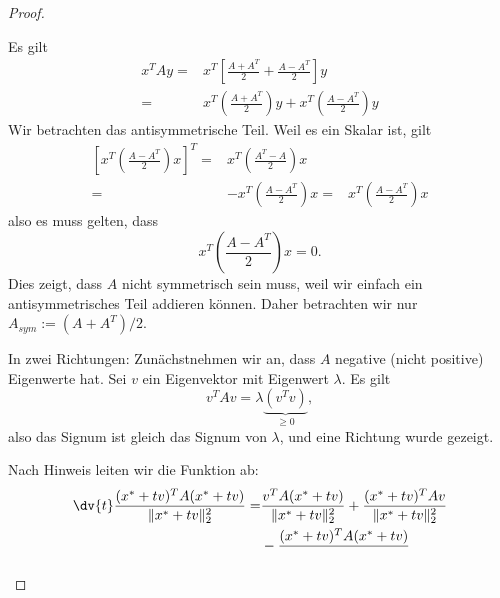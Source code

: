 \begin{proof}
	\begin{parts}
	\item Es gilt
		\begin{align*}
			x^TAy=&x^T\left[ \frac{A+A^T}{2}+\frac{A-A^T}{2} \right] y\\
			=&x^T\left( \frac{A+A^T}{2} \right)y+x^T\left( \frac{A-A^T}{2} \right) y
		\end{align*}
		Wir betrachten das antisymmetrische Teil. Weil es ein Skalar ist, gilt
		\begin{align*}
			\left[ x^T\left( \frac{A-A^T}{2} \right) x \right]^T=& x^T\left( \frac{A^T-A}{2} \right) x\\
			=&-x^T\left( \frac{A-A^T}{2} \right) x
			=&x^T\left( \frac{A-A^T}{2} \right) x
		\end{align*}
		also es muss gelten, dass
		\[
		x^T\left( \frac{A-A^T}{2} \right) x=0
		.\] 
		Dies zeigt, dass $A$ nicht symmetrisch sein muss, weil wir einfach ein antisymmetrisches Teil addieren können. Daher betrachten wir nur $A_{sym}:=(A+A^T) / 2$.

		In zwei Richtungen: Zunächstnehmen wir an, dass $A$ negative (nicht positive) Eigenwerte hat. Sei $v$ ein Eigenvektor mit Eigenwert $\lambda$. Es gilt
		\[
			v^TAv=\lambda\underbrace{(v^Tv)}_{\ge 0}
		,\]
		also das Signum ist gleich das Signum von $\lambda$, und eine Richtung wurde gezeigt.

		Nach Hinweis leiten wir die Funktion ab:
		\begin{align*}
			\dv{t}\frac{(x^*+tv)^TA(x^*+tv)}{\|x^*+tv\|_2^2}=&\frac{v^TA(x^*+tv)}{\|x^*+tv\|_2^2}+\frac{(x^*+tv)^TAv}{\|x^*+tv\|_2^2}\\
									 &-\frac{(x^*+tv)^TA(x^*+tv)}{}
		\end{align*}
	\end{parts}
\end{proof}
